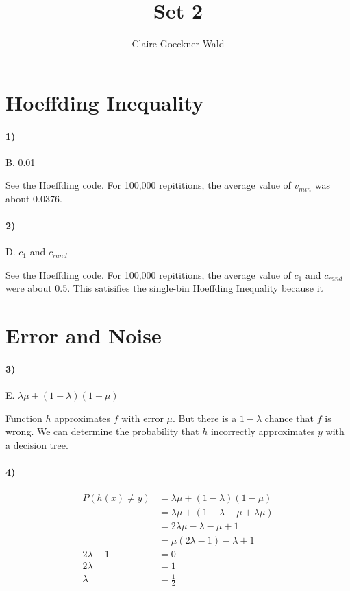 \documentclass[10pt,letter]{article}
\begin{document}
\title{Set 2}
\author{Claire Goeckner-Wald}
\maketitle 

\section*{Hoeffding Inequality}

\paragraph{1)} B. 0.01

	See the Hoeffding code. For 100,000 repititions, the average value of $v_{min}$ was about 0.0376.

\paragraph{2)} D. $c_1$ and $c_{rand}$

	See the Hoeffding code. For 100,000 repititions, the average value of $c_1$ and $c_{rand}$ were about 0.5. This satisifies the single-bin Hoeffding Inequality because it 

\section*{Error and Noise}

\paragraph{3)} E. $\lambda \mu + (1 - \lambda)(1 - \mu)$

	Function $h$ approximates $f$ with error $\mu$. But there is a $1-\lambda$ chance that $f$ is wrong. We can determine the probability that $h$ incorrectly approximates $y$ with a decision tree. \newpage

\paragraph{4)}

	\begin{align*}
	P(h(x) \neq y) &= \lambda \mu + (1 - \lambda)(1 - \mu) \\
	&= \lambda \mu + (1 - \lambda - \mu + \lambda\mu) \\
	&= 2\lambda \mu - \lambda - \mu + 1 \\
	&= \mu (2\lambda -1) - \lambda + 1 \\
	2\lambda -1 &= 0 \\
	2\lambda &= 1 \\
	\lambda &= \frac{1}{2}
	\end{align*}
\end{document}
